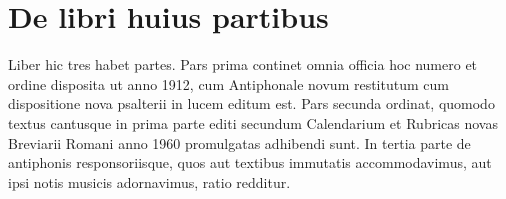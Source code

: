 \section*{De libri huius partibus}
Liber hic
tres
habet partes.
Pars prima continet omnia officia hoc numero et ordine disposita
ut anno 1912, cum Antiphonale novum restitutum
cum dispositione nova psalterii in lucem editum est.
Pars secunda ordinat, quomodo textus cantusque in prima parte
editi secundum Calendarium et Rubricas novas Breviarii Romani
anno 1960 promulgatas adhibendi sunt.
In tertia parte de antiphonis responsoriisque,
quos aut textibus immutatis accommodavimus,
aut ipsi notis musicis adornavimus, ratio redditur.
